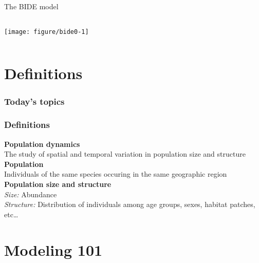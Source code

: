 \documentclass[color=usenames,dvipsnames]{beamer}\usepackage[]{graphicx}\usepackage[]{color}
\begin{document}
\begin{frame}
  \centering
    \huge
    The BIDE model \\
    \vfill

\begin{columns}
  \column{\dimexpr\paperwidth-10pt}
  \centering
  \texttt{[image: figure/bide0-1]} \\
\end{columns}
\end{frame}



\section{Definitions}


\begin{frame}
  \frametitle{Today's topics}
  \LARGE
\end{frame}


\begin{frame}
  \frametitle{Definitions}
  {\bf Population dynamics \\}
    The study of spatial and temporal variation in population size and structure
  \pause
  \vfill
  {\bf Population \\}
    Individuals of the same species occuring in the same geographic region
  \pause
  \vfill
  {\bf Population size and structure \\}
    {\color{Red}
      \it Size:} Abundance \\
    {\color{Red}
      \it Structure:} Distribution of individuals among age groups, sexes,
    habitat patches, etc\dots
\end{frame}



\section{Modeling 101}






\end{document}
